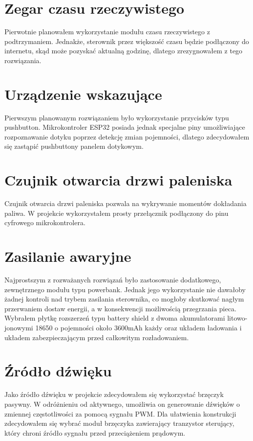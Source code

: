 \documentclass[11pt]{report}
\begin{document}
 \section{Zegar czasu rzeczywistego}
 Pierwotnie planowałem wykorzystanie modułu czasu rzeczywistego z podtrzymaniem. Jednakże, sterownik przez większość czasu będzie podłączony do internetu, skąd może pozyskać aktualną godzinę, dlatego zrezygnowałem z tego rozwiązania.
 
 \section{Urządzenie wskazujące}
 Pierwszym planowanym rozwiązaniem było wykorzystanie przycisków typu pushbutton. Mikrokontroler ESP32 posiada jednak specjalne piny umożliwiające rozpoznawanie dotyku poprzez detekcję zmian pojemności, dlatego zdecydowałem się zastąpić pushbuttony panelem dotykowym.
 
 \section{Czujnik otwarcia drzwi paleniska}
 Czujnik otwarcia drzwi paleniska pozwala na wykrywanie momentów dokładania paliwa. W projekcie wykorzystałem prosty przełącznik podłączony do pinu cyfrowego mikrokontrolera.
 
 \section{Zasilanie awaryjne}
 Najprostszym z rozważanych rozwiązań było zastosowanie dodatkowego, zewnętrznego modułu typu powerbank. Jednak jego wykorzystanie nie dawałoby żadnej kontroli nad trybem zasilania sterownika, co mogłoby skutkować nagłym przerwaniem dostaw energii, a w konsekwencji możliwością przegrzania pieca. Wybrałem płytkę rozszerzeń typu battery shield z dwoma akumulatorami litowo-jonowymi 18650 o pojemności około 3600mAh każdy oraz układem ładowania i układem zabezpieczającym przed całkowitym rozładowaniem.
 
 \section{Źródło dźwięku}
 Jako źródło dźwięku w projekcie zdecydowałem się wykorzystać brzęczyk pasywny. W odróżnieniu od aktywnego, umożliwia on generowanie dźwięków o zmiennej częstotliwości za pomocą sygnału PWM. Dla ułatwienia konstrukcji zdecydowałem się wybrać moduł brzęczyka zawierający tranzystor sterujący, który chroni źródło sygnału przed przeciążeniem prądowym.
 
\end{document}
